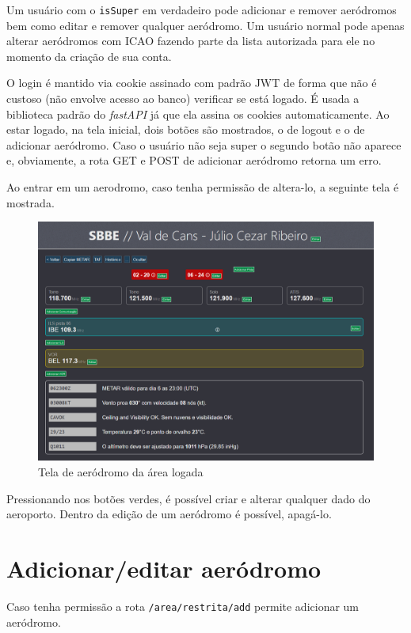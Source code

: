 Um usuário com o \verb|isSuper| em verdadeiro pode adicionar e remover aeródromos 
bem como editar e remover qualquer aeródromo. Um usuário normal pode apenas alterar 
aeródromos com ICAO fazendo parte da lista autorizada para ele no momento da criação
de sua conta.

O login é mantido via cookie assinado com padrão JWT de forma que não é custoso 
(não envolve acesso ao banco) verificar se está logado. É usada a biblioteca padrão 
do \textit{fastAPI} já que ela assina os cookies automaticamente.
Ao estar logado, na tela inicial, dois botões são mostrados, o de logout e o de adicionar 
aeródromo. Caso o usuário não seja super o segundo botão não aparece e, obviamente, 
a rota GET e POST de adicionar aeródromo retorna um erro.


Ao entrar em um aerodromo, caso tenha permissão de altera-lo, a seguinte tela
é mostrada.

\begin{figure}[H]
    \begin{center}
    \includegraphics[width=\linewidth]{img/admin-root.png}
    \caption{Tela de aeródromo da área logada}
    \label{fig:max-priv-sys}
    \end{center}
\end{figure}

Pressionando nos botões verdes, é possível criar e alterar qualquer dado do
aeroporto. Dentro da edição de um aeródromo é possível, apagá-lo.

\section {Adicionar/editar aeródromo}
Caso tenha permissão a rota \verb|/area/restrita/add| permite adicionar um aeródromo. 


